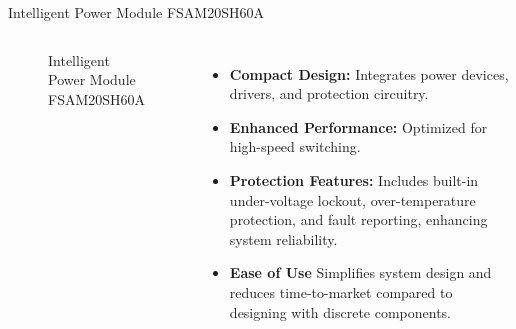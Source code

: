 \begin{frame}{Intelligent Power Module FSAM20SH60A}
	\begin{columns}
		\begin{figure}
			\centering
			\caption{Intelligent Power Module FSAM20SH60A}
		\end{figure}
		\begin{itemize}
			\item \textbf{Compact Design:} Integrates power devices, drivers, and protection circuitry.
			\item \textbf{Enhanced Performance:} Optimized for high-speed switching.
			\item \textbf{Protection Features:} Includes built-in under-voltage lockout, over-temperature protection, and fault reporting, enhancing system reliability.
			\item \textbf{Ease of Use} Simplifies system design and reduces time-to-market compared to designing with discrete components.
		\end{itemize}
	\end{columns}
\end{frame}



